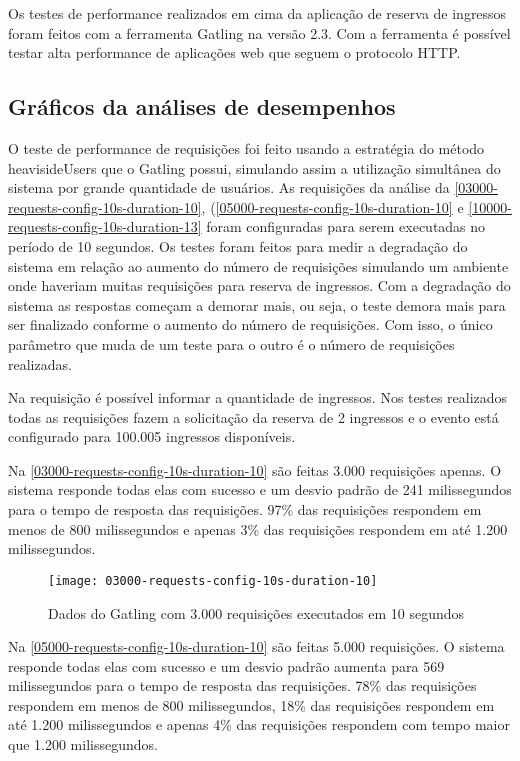 Os testes de performance realizados em cima da aplicação de reserva de ingressos foram
feitos com a ferramenta Gatling na versão 2.3.
Com a ferramenta é possível testar alta performance de aplicações web
\cite{gatling-docs} que seguem o protocolo HTTP.

\subsection{Gráficos da análises de desempenhos}

O teste de performance de requisições foi feito usando a
estratégia do método heavisideUsers \cite{gatling-simulation-setup}
que o Gatling possui, simulando assim a utilização simultânea do sistema por
grande quantidade de usuários.
As requisições da análise da
\autoref{03000-requests-config-10s-duration-10},
(\autoref{05000-requests-config-10s-duration-10}
e \autoref{10000-requests-config-10s-duration-13}
foram configuradas para serem executadas no período de 10 segundos.
Os testes foram feitos para medir a degradação do sistema em relação ao aumento do
número de requisições simulando um ambiente onde haveriam muitas requisições para
reserva de ingressos.
Com a degradação do sistema as respostas começam a demorar mais, ou seja,
o teste demora mais para ser finalizado conforme o aumento do número de requisições.
Com isso, o único parâmetro que muda de um teste para o outro
é o número de requisições realizadas.

Na requisição é possível informar a quantidade de ingressos.
Nos testes realizados todas as requisições fazem a solicitação da reserva de
2 ingressos e o evento está configurado para 100.005 ingressos disponíveis.

Na \autoref{03000-requests-config-10s-duration-10} são feitas 3.000 requisições apenas.
O sistema responde todas elas com sucesso e um desvio padrão de 241 milissegundos
para o tempo de resposta das requisições.
97\% das requisições respondem em menos de 800 milissegundos e apenas 3\% das requisições
respondem em até 1.200 milissegundos.

\begin{figure}[h]
  \texttt{[image: 03000-requests-config-10s-duration-10]}
  \caption{Dados do Gatling com 3.000 requisições executados em 10 segundos}
  \label{03000-requests-config-10s-duration-10}
\end{figure}

Na \autoref{05000-requests-config-10s-duration-10} são feitas 5.000 requisições.
O sistema responde todas elas com sucesso e um desvio padrão aumenta para 569 milissegundos
para o tempo de resposta das requisições.
78\% das requisições respondem em menos de 800 milissegundos, 18\% das requisições
respondem em até 1.200 milissegundos e apenas 4\% das requisições
respondem com tempo maior que 1.200 milissegundos.

